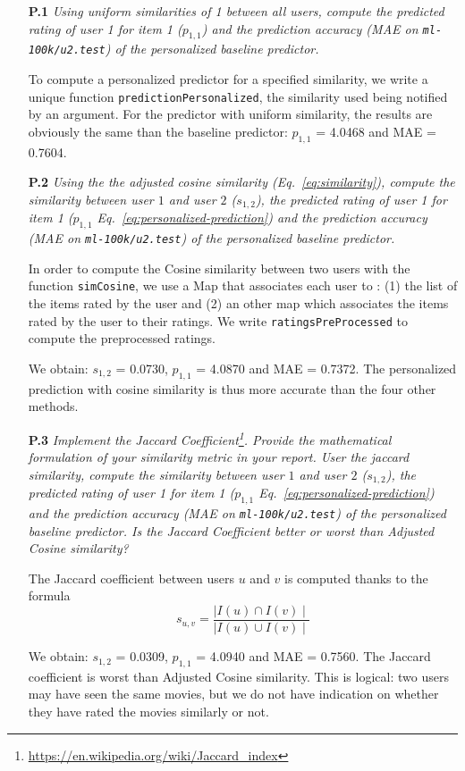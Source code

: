 \documentclass{article}
\begin{document}
  
\begin{itemize}
    \item [\textbf{P.1}] \textit{Using uniform similarities of 1 between all users, compute the predicted rating of user 1 for item 1 ($p_{1,1}$) and the prediction accuracy (MAE on \texttt{ml-100k/u2.test}) of the personalized baseline predictor.} 
    
    To compute a personalized predictor for a specified similarity, we write a unique function \texttt{predictionPersonalized}, the similarity used being notified by an argument. For the predictor with uniform similarity, the results are obviously the same than the baseline predictor: $p_{1,1}$ = 4.0468 and MAE = 0.7604.
    
    \item [\textbf{P.2}] \textit{Using the the adjusted cosine similarity (Eq.~\ref{eq:similarity}), compute the similarity between user $1$ and user $2$ ($s_{1,2}$), the predicted rating of user 1 for item 1 ($p_{1,1}$ Eq.~\ref{eq:personalized-prediction}) and the prediction accuracy (MAE on \texttt{ml-100k/u2.test}) of the personalized baseline predictor.} 
    
    In order to compute the Cosine similarity between two users with the function \texttt{simCosine}, we use a Map that associates each user to : (1) the list of the items rated by the user and (2) an other map which associates the items rated by the user to their ratings. We write \texttt{ratingsPreProcessed} to compute the preprocessed ratings.
    
    We obtain: $s_{1,2}$ = 0.0730, $p_{1,1}$ = 4.0870 and MAE =  0.7372. The personalized prediction with cosine similarity is thus more accurate than the four other methods.
    
        \item [\textbf{P.3}] \textit{Implement the Jaccard Coefficient\footnote{\url{https://en.wikipedia.org/wiki/Jaccard_index}}. Provide the mathematical formulation of your similarity metric in your report. User the jaccard similarity, compute the similarity between user $1$ and user $2$ ($s_{1,2}$), the predicted rating of user 1 for item 1 ($p_{1,1}$ Eq.~\ref{eq:personalized-prediction}) and the prediction accuracy (MAE on \texttt{ml-100k/u2.test}) of the personalized baseline predictor. Is the Jaccard Coefficient better or worst than Adjusted Cosine similarity?}
        
        The Jaccard coefficient between users $u$ and $v$ is computed thanks to the formula $$ s_{u,v} = \frac{\mid I(u) \cap I(v)\mid}{\mid I(u) \cup I(v)\mid}$$
        
        We obtain: $s_{1,2}$ = 0.0309, $p_{1,1}$ = 4.0940 and MAE = 0.7560. The Jaccard coefficient is worst than Adjusted Cosine similarity. This is logical: two users may have seen the same movies, but we do not have indication on whether they have rated the movies similarly or not.
        
        
\end{itemize}
\end{document}
